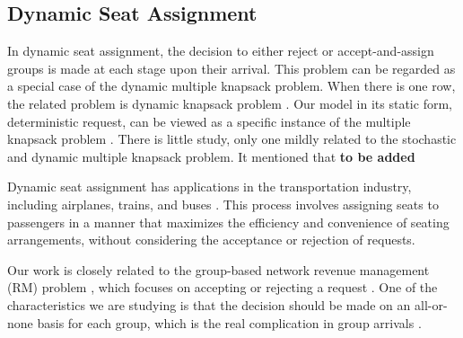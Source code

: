 


\subsection{Dynamic Seat Assignment}





In dynamic seat assignment, the decision to either reject or accept-and-assign groups is made at each stage upon their arrival. This problem can be regarded as a special case of the dynamic multiple knapsack problem. When there is one row, the related problem is dynamic knapsack problem \cite{kleywegt1998dynamic}. Our model in its static form, deterministic request, can be viewed as a specific instance of the multiple knapsack problem \cite{pisinger1999exact}. There is little study, only one mildly related to the stochastic and dynamic multiple knapsack problem. It mentioned that {\bf{to be added}}


Dynamic seat assignment has applications in the transportation industry, including airplanes, trains, and buses \cite{hamdouch2011schedule, berge1993demand}. This process involves assigning seats to passengers in a manner that maximizes the efficiency and convenience of seating arrangements, without considering the acceptance or rejection of requests.


Our work is closely related to the group-based network revenue management (RM) problem \cite{williamson1992airline}, which focuses on accepting or rejecting a request \cite{gallego1997multiproduct}. One of the characteristics we are studying is that the decision should be made on an all-or-none basis for each group, which is the real complication in group arrivals \cite{talluri2006theory}. 

